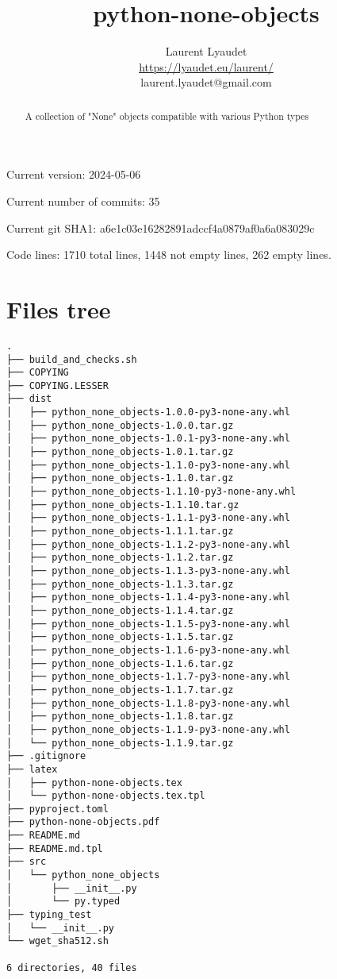 \documentclass{article}
\begin{document}
\author{
  Laurent Lyaudet\\
  \url{https://lyaudet.eu/laurent/}\\
  laurent.lyaudet@gmail.com
}
\title{python-none-objects}

\maketitle
\begin{abstract}
A collection of "None" objects
compatible with various Python types
\end{abstract}

Current version: 2024-05-06

Current number of commits: 35

Current git SHA1: a6e1c03e16282891adccf4a0879af0a6a083029c

Code lines: 1710 total lines, 1448 not empty lines, 262 empty lines.

\section{Files tree}
\label{section:tree}

\begin{verbatim}
.
├── build_and_checks.sh
├── COPYING
├── COPYING.LESSER
├── dist
│   ├── python_none_objects-1.0.0-py3-none-any.whl
│   ├── python_none_objects-1.0.0.tar.gz
│   ├── python_none_objects-1.0.1-py3-none-any.whl
│   ├── python_none_objects-1.0.1.tar.gz
│   ├── python_none_objects-1.1.0-py3-none-any.whl
│   ├── python_none_objects-1.1.0.tar.gz
│   ├── python_none_objects-1.1.10-py3-none-any.whl
│   ├── python_none_objects-1.1.10.tar.gz
│   ├── python_none_objects-1.1.1-py3-none-any.whl
│   ├── python_none_objects-1.1.1.tar.gz
│   ├── python_none_objects-1.1.2-py3-none-any.whl
│   ├── python_none_objects-1.1.2.tar.gz
│   ├── python_none_objects-1.1.3-py3-none-any.whl
│   ├── python_none_objects-1.1.3.tar.gz
│   ├── python_none_objects-1.1.4-py3-none-any.whl
│   ├── python_none_objects-1.1.4.tar.gz
│   ├── python_none_objects-1.1.5-py3-none-any.whl
│   ├── python_none_objects-1.1.5.tar.gz
│   ├── python_none_objects-1.1.6-py3-none-any.whl
│   ├── python_none_objects-1.1.6.tar.gz
│   ├── python_none_objects-1.1.7-py3-none-any.whl
│   ├── python_none_objects-1.1.7.tar.gz
│   ├── python_none_objects-1.1.8-py3-none-any.whl
│   ├── python_none_objects-1.1.8.tar.gz
│   ├── python_none_objects-1.1.9-py3-none-any.whl
│   └── python_none_objects-1.1.9.tar.gz
├── .gitignore
├── latex
│   ├── python-none-objects.tex
│   └── python-none-objects.tex.tpl
├── pyproject.toml
├── python-none-objects.pdf
├── README.md
├── README.md.tpl
├── src
│   └── python_none_objects
│       ├── __init__.py
│       └── py.typed
├── typing_test
│   └── __init__.py
└── wget_sha512.sh

6 directories, 40 files
\end{verbatim}
\end{document}
